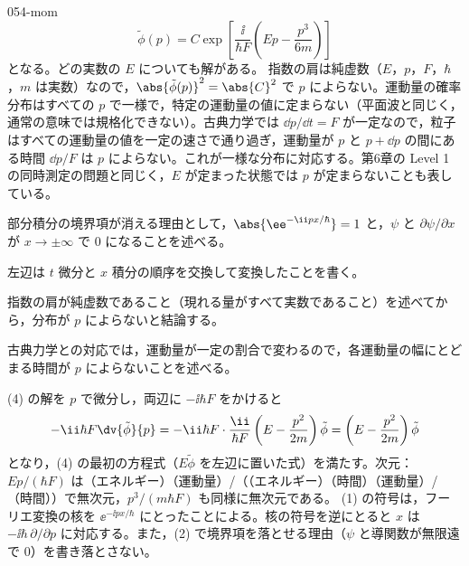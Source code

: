 \documentclass[uplatex,dvipdfmx,a4paper,11pt]{jsarticle}
\begin{document}
\begin{kaisetsu}{054-mom}
\[ \tilde{\phi}(p)=C\exp\left[\frac{\ii}{\hbar F}\left(Ep-\frac{p^{3}}{6m}\right)\right] \]
となる。どの実数の $E$ についても解がある。
 指数の肩は純虚数（$E$，$p$，$F$，$\hbar$，$m$ は実数）なので，$\abs{\tilde{\phi}(p)}^{2}=\abs{C}^{2}$ で $p$ によらない。運動量の確率分布はすべての $p$ で一様で，特定の運動量の値に定まらない（平面波と同じく，通常の意味では規格化できない）。古典力学では $\dd p/\dd t=F$ が一定なので，粒子はすべての運動量の値を一定の速さで通り過ぎ，運動量が $p$ と $p+\dd p$ の間にある時間 $\dd p/F$ は $p$ によらない。これが一様な分布に対応する。第6章の Level 1 の同時測定の問題と同じく，$E$ が定まった状態では $p$ が定まらないことも表している。
\begin{ronten}
  \item {} 部分積分の境界項が消える理由として，$\abs{\ee^{-\ii px/\hbar}}=1$ と，$\psi$ と $\partial\psi/\partial x$ が $x\to\pm\infty$ で $0$ になることを述べる。
  \item {} 左辺は $t$ 微分と $x$ 積分の順序を交換して変換したことを書く。
  \item {} 指数の肩が純虚数であること（現れる量がすべて実数であること）を述べてから，分布が $p$ によらないと結論する。
  \item {} 古典力学との対応では，運動量が一定の割合で変わるので，各運動量の幅にとどまる時間が $p$ によらないことを述べる。
\end{ronten}
\kenzan (4) の解を $p$ で微分し，両辺に $-\ii\hbar F$ をかけると
\[ -\ii\hbar F\dv{\tilde{\phi}}{p}=-\ii\hbar F\cdot\frac{\ii}{\hbar F}\left(E-\frac{p^{2}}{2m}\right)\tilde{\phi}=\left(E-\frac{p^{2}}{2m}\right)\tilde{\phi} \]
となり，(4) の最初の方程式（$E\tilde{\phi}$ を左辺に置いた式）を満たす。次元：$Ep/(\hbar F)$ は（エネルギー）（運動量）/（（エネルギー）（時間）（運動量）/（時間））で無次元，$p^{3}/(m\hbar F)$ も同様に無次元である。
\tsumazuki (1) の符号は，フーリエ変換の核を $\ee^{-\ii px/\hbar}$ にとったことによる。核の符号を逆にとると $x$ は $-\ii\hbar\,\partial/\partial p$ に対応する。また，(2) で境界項を落とせる理由（$\psi$ と導関数が無限遠で $0$）を書き落とさない。
\end{kaisetsu}
\end{document}
